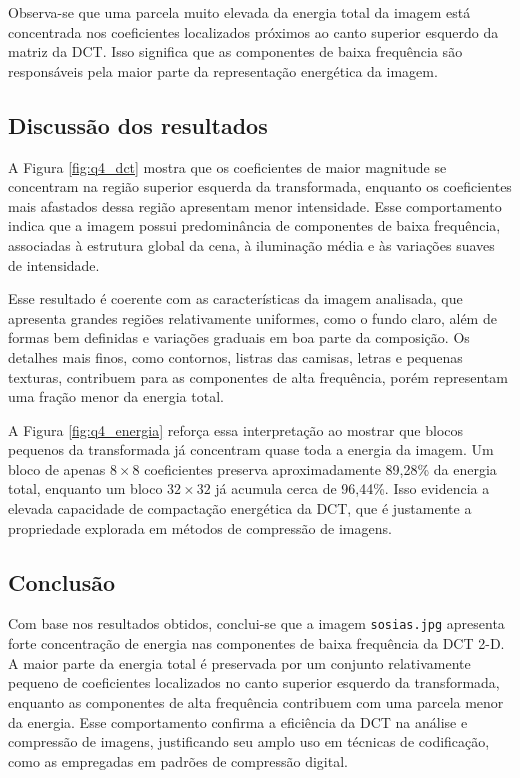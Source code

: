 \documentclass[12pt,a4paper]{article}
\begin{document}
Observa-se que uma parcela muito elevada da energia total da imagem está concentrada nos coeficientes localizados próximos ao canto superior esquerdo da matriz da DCT. Isso significa que as componentes de baixa frequência são responsáveis pela maior parte da representação energética da imagem.

\subsection{Discussão dos resultados}

A Figura \ref{fig:q4_dct} mostra que os coeficientes de maior magnitude se concentram na região superior esquerda da transformada, enquanto os coeficientes mais afastados dessa região apresentam menor intensidade. Esse comportamento indica que a imagem possui predominância de componentes de baixa frequência, associadas à estrutura global da cena, à iluminação média e às variações suaves de intensidade.

Esse resultado é coerente com as características da imagem analisada, que apresenta grandes regiões relativamente uniformes, como o fundo claro, além de formas bem definidas e variações graduais em boa parte da composição. Os detalhes mais finos, como contornos, listras das camisas, letras e pequenas texturas, contribuem para as componentes de alta frequência, porém representam uma fração menor da energia total.

A Figura \ref{fig:q4_energia} reforça essa interpretação ao mostrar que blocos pequenos da transformada já concentram quase toda a energia da imagem. Um bloco de apenas \(8 \times 8\) coeficientes preserva aproximadamente 89,28\% da energia total, enquanto um bloco \(32 \times 32\) já acumula cerca de 96,44\%. Isso evidencia a elevada capacidade de compactação energética da DCT, que é justamente a propriedade explorada em métodos de compressão de imagens.

\subsection{Conclusão}

Com base nos resultados obtidos, conclui-se que a imagem \texttt{sosias.jpg} apresenta forte concentração de energia nas componentes de baixa frequência da DCT 2-D. A maior parte da energia total é preservada por um conjunto relativamente pequeno de coeficientes localizados no canto superior esquerdo da transformada, enquanto as componentes de alta frequência contribuem com uma parcela menor da energia. Esse comportamento confirma a eficiência da DCT na análise e compressão de imagens, justificando seu amplo uso em técnicas de codificação, como as empregadas em padrões de compressão digital.
\end{document}
